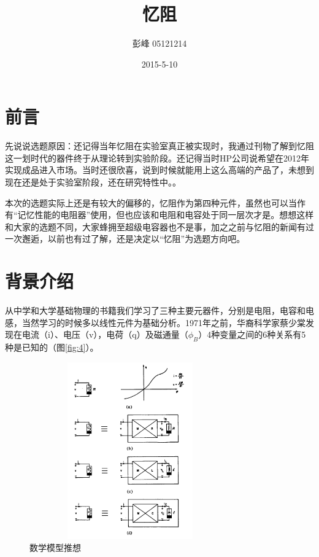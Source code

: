 \documentclass[UTF8]{article}
\begin{document}
 
\author{    彭峰     05121214   }
 \date{2015-5-10}
\title{忆阻}  %
\titlelabel{\S\thetitle\quad}
\maketitle%

\section{前言}
先说说选题原因：还记得当年忆阻在实验室真正被实现时，我通过刊物了解到忆阻这一划时代的器件终于从理论转到实验阶段。还记得当时HP公司说希望在2012年实现成品进入市场。当时还很欣喜，说到时候就能用上这么高端的产品了，未想到现在还是处于实验室阶段，还在研究特性中。。

本次的选题实际上还是有较大的偏移的，忆阻作为第四种元件，虽然也可以当作有“记忆性能的电阻器”使用，但也应该和电阻和电容处于同一层次才是。想想这样和大家的选题不同，大家蜂拥至超级电容器也不是事，加之之前与忆阻的新闻有过一次邂逅，以前也有过了解，还是决定以“忆阻”为选题方向吧。

\section{背景介绍}
从中学和大学基础物理的书籍我们学习了三种主要元器件，分别是电阻，电容和电感，当然学习的时候多以线性元件为基础分析。1971年之前，华裔科学家蔡少棠发现在电流（i）、电压（v），电荷（q）及磁通量（$\phi_{B}$）4种变量之间的6种关系有5种是已知的（图\eqref{fig:4}）。
\begin{figure}[htbp]
\centering
\includegraphics[width=3.42in,height=3in]{pic/4}
\caption{数学模型推想}
\label{fig:4}
\end{figure}
\end{document}
